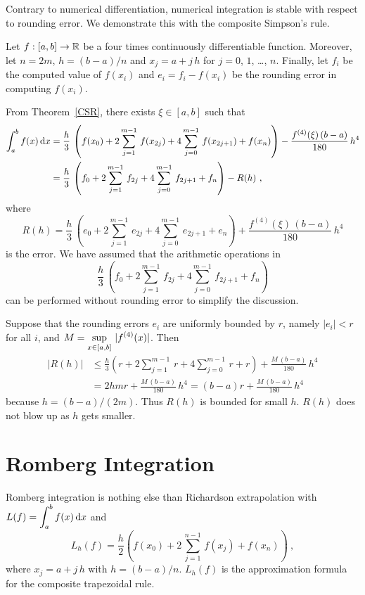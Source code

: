 \begin{rmk}
Contrary to numerical differentiation, numerical integration is
stable with respect to rounding error.  We demonstrate this with the
composite Simpson's rule.

Let $f:[a,b]\rightarrow \mathbb{R}$ be a four times continuously
differentiable function.  Moreover, let $n=2m$, $h=(b-a)/n$ and
$x_j = a+j\,h$ for $j=0$, $1$, \ldots, $n$.  Finally, let
$f_i$ be the computed value of $f(x_i)$ and
$e_i = f_i - f(x_i)$ be the rounding error in computing
$f(x_i)$.

From Theorem~\ref{CSR}, there exists $\xi \in [a,b]$ such that
\begin{align*}
\int_{a}^{b}f(x)\,\mathrm{d}x &=
\frac{h}{3}\, \left(f(x_0) + 2\sum_{j=1}^{m-1}\,f(x_{2j}) + 4
\sum_{j=0}^{m-1}\,f(x_{2j+1}) + f(x_n) \right) -
\frac{f^{(4)}(\xi)\,(b-a)}{180}\,h^4 \\
&= \frac{h}{3}\, \left(f_0 + 2 \sum_{j=1}^{m-1}\,f_{2j}
+ 4 \sum_{j=0}^{m-1}\,f_{2j+1} + f_n \right) - R(h) \ ,
\end{align*}
where
\[
R(h) = \frac{h}{3}\, \left(e_0 + 2\sum_{j=1}^{m-1}\,e_{2j}
+ 4 \sum_{j=0}^{m-1}\,e_{2j+1} + e_n \right) +
\frac{f^{(4)}(\xi)\,(b-a)}{180}\,h^4
\]
is the error.  We have assumed that the arithmetic operations in
\[
\frac{h}{3}\, \left(f_0 + 2 \sum_{j=1}^{m-1}\,f_{2j}
+ 4 \sum_{j=0}^{m-1}\,f_{2j+1} + f_n \right)
\]
can be performed without rounding error to simplify the discussion.

Suppose that the rounding errors $e_i$ are uniformly bounded by
$r$, namely $|e_i| < r$ for all $i$, and
$\displaystyle M = \sup_{x \in [a,b]}\,|f^{(4)}(x)|$.  Then
\begin{align*}
|R(h)| &\leq \frac{h}{3} \left(r + 2\sum_{j=1}^{m-1}\,r + 4
\sum_{j=0}^{m-1}\,r + r \right) + \frac{M\,(b-a)}{180}\,h^4 \\
&= 2hmr + \frac{M\,(b-a)}{180}\,h^4
= (b-a)r + \frac{M\,(b-a)}{180}\,h^4
\end{align*}
because $h = (b-a)/(2m)$.  Thus $R(h)$ is bounded for small $h$.
$R(h)$ does not blow up as $h$ gets smaller.
\end{rmk}

\section{Romberg Integration}

Romberg integration is nothing else than Richardson extrapolation
with $\displaystyle L(f) = \int_{a}^{b} f(x)\,\mathrm{d}x$ and
\begin{equation} \label{Rombform}
L_h(f) = \frac{h}{2} \left( f(x_0) + 2\,\sum_{j=1}^{n-1}\,f(x_j)
+ f(x_n)\right) \ ,
\end{equation}
where $x_j = a + j\,h$ with $h=(b-a)/n$.  $L_h(f)$ is
the approximation formula for the composite trapezoidal rule.

